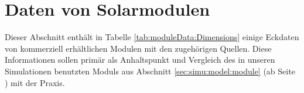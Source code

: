 \chapter{Daten von Solarmodulen}
\label{app:commercial:modules}

Dieser Abschnitt  enth\"alt in Tabelle  \ref{tab:moduleData:Dimensions} einige
Eckdaten  von   kommerziell  erh\"altlichen  Modulen  mit   den  zugeh\"origen
Quellen. Diese   Informationen   sollen    prim\"ar   als   Anhaltspunkt   und
Vergleich  des   in  unseren  Simulationen  benutzten   Moduls  aus  Abschnitt
\ref{sec:simu:model:module} (ab Seite \pageref{sec:simu:model:module}) mit der
Praxis.

